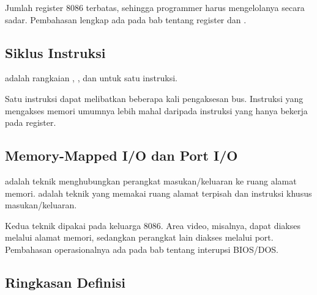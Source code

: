 Jumlah register 8086 terbatas, sehingga programmer harus
mengelolanya secara sadar. Pembahasan lengkap ada pada bab tentang
register dan .

\subsection{Siklus Instruksi}

\begin{definisi}
 adalah rangkaian , ,
dan  untuk satu instruksi.
\end{definisi}

Satu instruksi dapat melibatkan beberapa kali pengaksesan bus.
Instruksi yang mengakses memori umumnya lebih mahal daripada
instruksi yang hanya bekerja pada register.

\subsection{Memory-Mapped I/O dan Port I/O}

\begin{definisi}
 adalah teknik menghubungkan perangkat
masukan/keluaran ke ruang alamat memori.  adalah
teknik yang memakai ruang alamat terpisah dan instruksi khusus
masukan/keluaran.
\end{definisi}

Kedua teknik dipakai pada keluarga 8086. Area video, misalnya, dapat
diakses melalui alamat memori, sedangkan perangkat lain diakses
melalui port. Pembahasan operasionalnya ada pada bab tentang
interupsi BIOS/DOS.

\subsection{Ringkasan Definisi}

